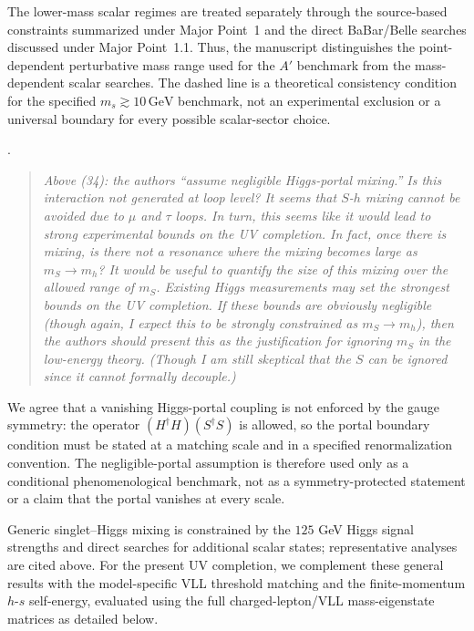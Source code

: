 \documentclass[12pt,a4paper]{article}
\begin{document}
The lower-mass scalar regimes are treated separately through the source-based constraints summarized under Major Point~1 and the direct BaBar/Belle searches discussed under Major Point~1.1. Thus, the manuscript distinguishes the point-dependent perturbative mass range used for the \(A'\) benchmark from the mass-dependent scalar searches. The dashed line is a theoretical consistency condition for the specified \(m_s\gtrsim10\,\mathrm{GeV}\) benchmark, not an experimental exclusion or a universal boundary for every possible scalar-sector choice.

\medskip
{}. \begin{quote}\itshape
Above (34): the authors ``assume negligible Higgs-portal mixing.'' Is this interaction not generated at loop level? It seems that \(S\)-\(h\) mixing cannot be avoided due to \(\mu\) and \(\tau\) loops. In turn, this seems like it would lead to strong experimental bounds on the UV completion. In fact, once there is mixing, is there not a resonance where the mixing becomes large as \(m_S\to m_h\)? It would be useful to quantify the size of this mixing over the allowed range of \(m_S\). Existing Higgs measurements may set the strongest bounds on the UV completion. If these bounds are obviously negligible (though again, I expect this to be strongly constrained as \(m_S\to m_h\)), then the authors should present this as the justification for ignoring \(m_S\) in the low-energy theory. (Though I am still skeptical that the \(S\) can be ignored since it cannot formally decouple.)\end{quote}

We agree that a vanishing Higgs-portal coupling is not enforced by the gauge symmetry: the operator \((H^\dagger H)(S^\dagger S)\) is allowed, so the portal boundary condition must be stated at a matching scale and in a specified renormalization convention. The negligible-portal assumption is therefore used only as a conditional phenomenological benchmark, not as a symmetry-protected statement or a claim that the portal vanishes at every scale.

Generic singlet--Higgs mixing is constrained by the \(125\) GeV Higgs signal strengths and direct searches for additional scalar states; representative analyses are cited above. For the present UV completion, we complement these general results with the model-specific VLL threshold matching and the finite-momentum \(h\)-\(s\) self-energy, evaluated using the full charged-lepton/VLL mass-eigenstate matrices as detailed below.
\end{document}

